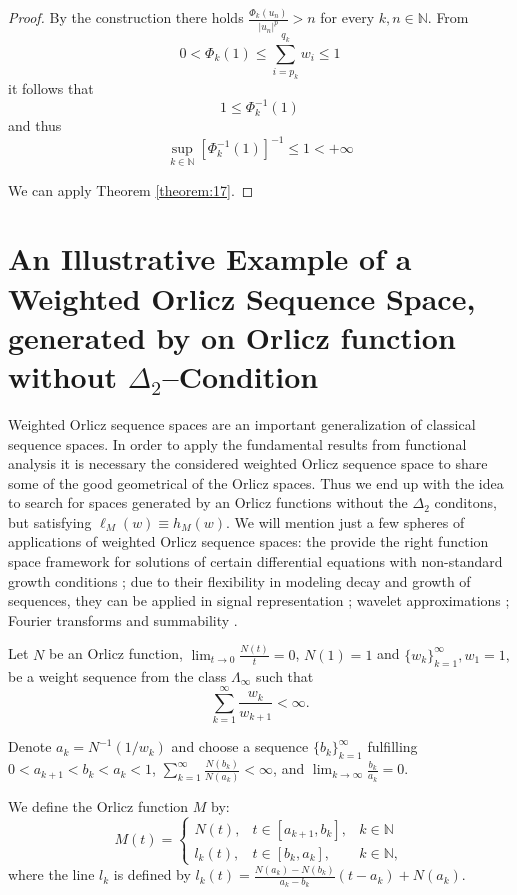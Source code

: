 \documentclass[12pt]{article}
\theoremstyle{thmstyleone}%
\theoremstyle{thmstyletwo}%
\theoremstyle{thmstylethree}%
\begin{document}
{{\begin{proof}
	By the construction there holds $\frac{\Phi_k(u_n)}{|u_n|^p}>n$ for every $k,n\in\mathbb{N}$.
	From
	$$
	0<\Phi_k\left(1\right)\leq \sum_{i=p_k}^{q_k}w_i\leq 1
	$$
	it follows that 
	$$
	1\leq \Phi_k^{-1}\left(1\right)
	$$
	and thus
	$$
	\sup_{k\in\mathbb{N}}\left[\Phi_k^{-1}\left(1\right)\right]^{-1}\leq 1<+\infty
	$$
	
	
	We can apply Theorem \ref{theorem:17}.
\end{proof}}

\section{An Illustrative Example of a Weighted Orlicz Sequence Space, generated by on Orlicz function without $\Delta_2$--Condition}

Weighted Orlicz sequence spaces are an important generalization of classical sequence spaces. 
	In order to apply the fundamental results from functional analysis it is necessary the considered 
	weighted Orlicz sequence space to share some of the good geometrical of the Orlicz spaces. Thus we end up with 
	the idea to search for spaces generated by an Orlicz functions without the $\Delta_2$ conditons, but satisfying $\ell_M(w)\equiv h_M(w)$. We will mention just a few spheres of applications of weighted Orlicz sequence spaces: the provide the right function space framework for solutions of certain differential equations with non-standard growth conditions \cite{Radulescu-Repovs}; due to their flexibility in modeling decay and growth of sequences, they can be applied in signal representation \cite{Donnini-Vinti}; wavelet approximations \cite{Krivoshein-Skopina}; Fourier transforms and summability \cite{Jia}.

Let $N$ be an Orlicz function, $\displaystyle\lim_{t\to 0}\displaystyle\frac{N(t)}{t}=0$,
$N(1)=1$ and $\{w_k\}_{k=1}^\infty, w_1=1,$ be a weight sequence
from the class $\Lambda_\infty$ such that
{\begin{equation}\label{equation:26-z} 
	\sum_{k=1}^\infty\displaystyle\frac{w_k}{w_{k+1}}<\infty.
\end{equation}}

Denote
$a_k=N^{-1}(1/w_k)$ and choose a sequence $\{b_k\}_{k=1}^\infty$
fulfilling $0<a_{k+1}<b_k<a_k<1$, $\sum_{k=1}^\infty \frac{N(b_k)}{N(a_k)}<\infty$, and $	\lim_{k\to\infty}\frac{b_{k}}{a_k}=0$.

We define the Orlicz function $M$ by: 
\begin{equation}\label{equation:26} 
	M(t)=\left\{
	\begin{array}{lll}
		N(t),&t\in [a_{k+1},b_k],& k\in\mathbb{N}\\
		l_k(t),&t\in [b_k,a_k],& k\in\mathbb{N} ,
	\end{array}\right.
\end{equation}
where the line $l_k$ is defined by
$l_k(t)=\displaystyle\frac{N(a_k)-N(b_k)}{a_k-b_k}(t-a_k)+N(a_k)$.

}
\end{document}

